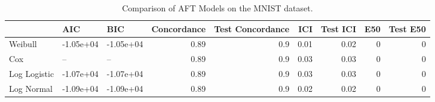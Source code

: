 \begin{table*}
\centering
\caption{Comparison of AFT Models on the MNIST dataset.}
\label{tab:mnist}
\begin{tabular}{lllrrrrrr}
\toprule
 & AIC & BIC & Concordance & Test Concordance & ICI & Test ICI & E50 & Test E50 \\
\midrule
Weibull & -1.05e+04 & -1.05e+04 & 0.89 & 0.9 & 0.01 & 0.02 & 0 & 0 \\
Cox & -- & -- & 0.89 & 0.9 & 0.03 & 0.03 & 0 & 0 \\
Log Logistic & -1.07e+04 & -1.07e+04 & 0.89 & 0.9 & 0.03 & 0.03 & 0 & 0 \\
Log Normal & -1.09e+04 & -1.09e+04 & 0.89 & 0.9 & 0.02 & 0.02 & 0 & 0 \\
\bottomrule
\end{tabular}
\end{table*}
